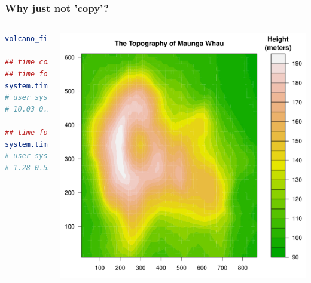 \documentclass{beamer}
\begin{document}
\begin{frame}[fragile]
\frametitle{Why just not 'copy'?}

\begin{columns}[c]
\begin{lstlisting}[language = R]
volcano_filled.contour()

## time comparison
## time for loop version
system.time(grid.echo())
# user system elapsed
# 10.03 0.23 10.32

## time for vectorizetion
system.time(grid.echo())
# user system elapsed
# 1.28 0.53 1.82
\end{lstlisting}

\begin{center}
\includegraphics{plot/filled_example_1}
\end{center}

\end{columns}
\end{frame}



\end{document}

